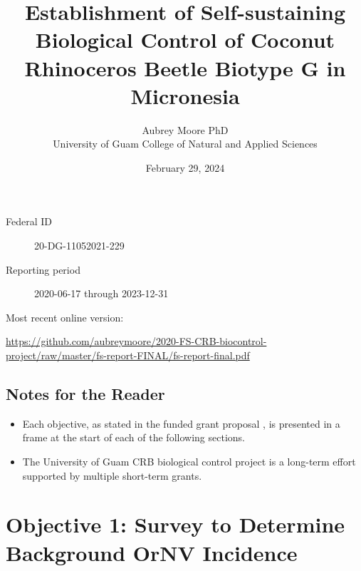 \documentclass[12pt,letterpaper,english,bibliography=totocnumbered, abstract=on]{scrartcl}
\begin{document}
\titlehead{Final Report: USFS 20-DG-11052021-229}

\title{Establishment of Self-sustaining Biological Control of Coconut Rhinoceros Beetle Biotype G in Micronesia }

\author{Aubrey Moore PhD\\University of Guam College of Natural and Applied Sciences}

\date{February 29, 2024}

\maketitle

\begin{description}
	\item[Federal ID] 20-DG-11052021-229
	\item[Reporting period] 2020-06-17 through 2023-12-31
\end{description}

Most recent online version: \\
\begin{footnotesize}	
	\url{https://github.com/aubreymoore/2020-FS-CRB-biocontrol-project/raw/master/fs-report-FINAL/fs-report-final.pdf}
\end{footnotesize}

\clearpage

\tableofcontents

\clearpage


\newpage

\subsection*{Notes for the Reader}

\begin{itemize}

\item Each objective, as stated in the funded grant proposal \cite{mooreGrantProposalDOIOIA2020}, is presented in a frame at the start of each of the following sections. 

\item The University of Guam CRB biological control project is a long-term effort supported by multiple short-term grants.  

\end{itemize}

\clearpage

\section{Objective 1: Survey to Determine Background OrNV Incidence} 
\end{document}
